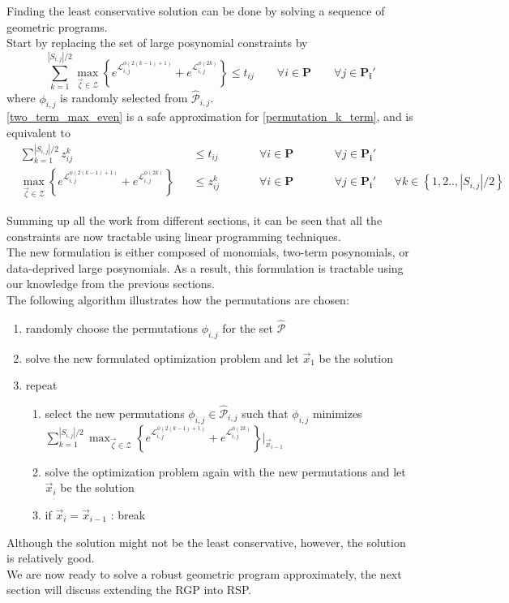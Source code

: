Finding the least conservative solution can be done by solving a sequence of geometric programs.\\
Start by replacing the set of large posynomial constraints by
\begin{equation}
\textstyle{\sum}_{k=1}^{|S_{i,j}|/2} \max_{\vec{\zeta} \in \mathcal{Z}} \left\{e^{\mathcal{L}^{\phi(2(k-1)+1)}_{i,j}} + e^{\mathcal{L}^{\phi(2k)}_{i,j}}\right\}\leq t_{ij} \qquad \forall i \in \mathbf{P} \qquad \forall j \in \mathbf{P_i'}
\label{two_term_max_even}
\end{equation}
where $\phi_{i,j}$ is randomly selected from $\hat{\mathcal{P}}_{i,j}$.\\
\eqref{two_term_max_even} is a safe approximation for \eqref{permutation_k_term}, and is equivalent to
\begin{equation}
\begin{aligned}
&\textstyle{\sum}_{k=1}^{|S_{i,j}|/2} z_{ij}^k &&\leq t_{ij} \qquad &&\forall i \in \mathbf{P} \qquad &&\forall j \in \mathbf{P_i'}\\
&\max_{\vec{\zeta} \in \mathcal{Z}} \left\{e^{\mathcal{L}^{\phi(2(k-1)+1)}_{i,j}} + e^{\mathcal{L}^{\phi(2k)}_{i,j}}\right\} &&\leq z_{ij}^k &&\forall i \in \mathbf{P} \qquad &&\forall j \in \mathbf{P_i'} &&\forall k \in \left\{1,2..,|S_{i,j}|/2\right\}
\end{aligned}
\label{two_term_even}
\end{equation}

Summing up all the work from different sections, it can be seen that all the constraints are now tractable using linear programming techniques.\\
The new formulation is either composed of monomials, two-term posynomials, or data-deprived large posynomials. As a result, this formulation is tractable using our knowledge from the previous sections.\\[12pt]
The following algorithm illustrates how the permutations are chosen:
\begin{enumerate}
\item randomly choose the permutations $\phi_{i,j}$ for the set $\hat{\mathcal{P}}$
\item solve the new formulated optimization problem and let $\vec{x}_1$ be the solution
\item repeat
\begin{enumerate}
\item select the new permutations $\phi_{i,j} \in \hat{\mathcal{P}}_{i,j}$ such that $\phi_{i,j}$ minimizes $\textstyle{\sum}_{k=1}^{|S_{i,j}|/2} \max_{\vec{\zeta} \in \mathcal{Z}} \left\{e^{\mathcal{L}^{\phi(2(k-1)+1)}_{i,j}} + e^{\mathcal{L}^{\phi(2k)}_{i,j}}\right\}\bigg\rvert_{\vec{x}_{i-1}}$
\item solve the optimization problem again with the new permutations and let $\vec{x}_i$ be the solution
\item if $\vec{x}_i = \vec{x}_{i-1}$ : break
\end{enumerate}
\end{enumerate}
Although the solution might not be the least conservative, however, the solution is relatively good.\\[12pt]
We are now ready to solve a robust geometric program approximately, the next section will discuss extending the RGP into RSP.
